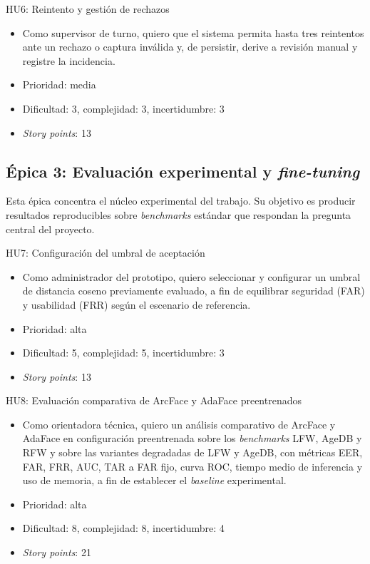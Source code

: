 \documentclass[
  11pt, %
]{charter}
\begin{document}
HU6: Reintento y gestión de rechazos
\begin{itemize}
  \item Como supervisor de turno, quiero que el sistema permita hasta tres reintentos ante un rechazo o captura inválida y, de persistir, derive a revisión manual y registre la incidencia.
  \item Prioridad: media
  \item Dificultad: 3, complejidad: 3, incertidumbre: 3
  \item \textit{Story points}: 13
\end{itemize}

\subsection{Épica 3: Evaluación experimental y \textit{fine-tuning}}

Esta épica concentra el núcleo experimental del trabajo. Su objetivo es producir resultados reproducibles sobre \textit{benchmarks} estándar que respondan la pregunta central del proyecto.

HU7: Configuración del umbral de aceptación
\begin{itemize}
  \item Como administrador del prototipo, quiero seleccionar y configurar un umbral de distancia coseno previamente evaluado, a fin de equilibrar seguridad (FAR) y usabilidad (FRR) según el escenario de referencia.
  \item Prioridad: alta
  \item Dificultad: 5, complejidad: 5, incertidumbre: 3
  \item \textit{Story points}: 13
\end{itemize}

HU8: Evaluación comparativa de ArcFace y AdaFace preentrenados
\begin{itemize}
  \item Como orientadora técnica, quiero un análisis comparativo de ArcFace y AdaFace en configuración preentrenada sobre los \textit{benchmarks} LFW, AgeDB y RFW y sobre las variantes degradadas de LFW y AgeDB, con métricas EER, FAR, FRR, AUC, TAR a FAR fijo, curva ROC, tiempo medio de inferencia y uso de memoria, a fin de establecer el \textit{baseline} experimental.
  \item Prioridad: alta
  \item Dificultad: 8, complejidad: 8, incertidumbre: 4
  \item \textit{Story points}: 21
\end{itemize}
\end{document}
